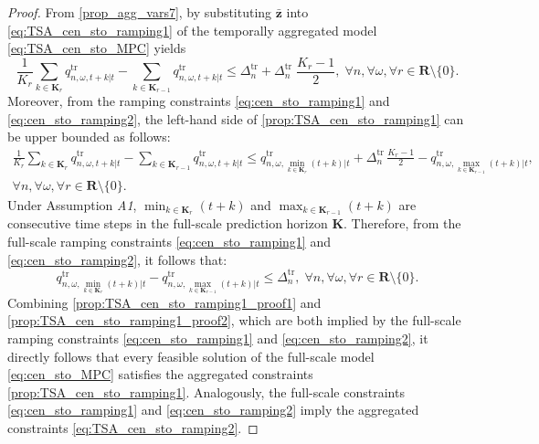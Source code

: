 \documentclass[10pt,a4paper]{amsart}
\begin{document}
\begin{proof}
From \eqref{prop_agg_vars7}, by substituting $\boldsymbol{\bar{z}}$ into \eqref{eq:TSA_cen_sto_ramping1} of the temporally aggregated model \eqref{eq:TSA_cen_sto_MPC} yields
\begin{equation}
\frac{1}{K_r} \sum_{k \in \boldsymbol{K}_r} q^{\mathrm{tr}}_{n, \omega, t+k|t}
- \sum_{k \in \boldsymbol{K}_{r-1}} q^{\mathrm{tr}}_{n, \omega, t+k|t}
\leq
\Delta^{\mathrm{tr}}_{n} + \Delta^{\mathrm{tr}}_{n} \; \frac{K_r - 1}{2}, \; \forall n, \forall \omega, \forall r \in \boldsymbol{R} \setminus \{0\}.
\label{prop:TSA_cen_sto_ramping1}
\end{equation}
Moreover, from the ramping constraints \eqref{eq:cen_sto_ramping1} and \eqref{eq:cen_sto_ramping2}, the left-hand side of \eqref{prop:TSA_cen_sto_ramping1} can be upper bounded as follows:
\begin{multline}
\frac{1}{K_r} \sum_{k \in \boldsymbol{K}_r} q^{\mathrm{tr}}_{n, \omega, t+k|t}
- \sum_{k \in \boldsymbol{K}_{r-1}} q^{\mathrm{tr}}_{n, \omega, t+k|t}
\leq
q^{\mathrm{tr}}_{n, \omega, \min_{k \in \boldsymbol{K}_r}(t+k)|t} + \Delta^{\mathrm{tr}}_{n} \, \frac{K_r - 1}{2} - q^{\mathrm{tr}}_{n, \omega, \max_{k \in \boldsymbol{K}_{r-1}}(t+k)|t},\\
\forall n, \forall \omega, \forall r \in \boldsymbol{R} \setminus \{0\}.
\label{prop:TSA_cen_sto_ramping1_proof1}
\end{multline}
Under Assumption \textit{A1}, $\min_{k \in \boldsymbol{K}_r}(t+k)$ and $\max_{k \in \boldsymbol{K}_{r-1}}(t+k)$ are consecutive time steps in the full-scale prediction horizon $\boldsymbol{K}$. Therefore, from the full-scale ramping constraints \eqref{eq:cen_sto_ramping1} and \eqref{eq:cen_sto_ramping2}, it follows that:
\begin{equation}
q^{\mathrm{tr}}_{n, \omega, \min_{k \in \boldsymbol{K}_r}(t+k)|t} - q^{\mathrm{tr}}_{n, \omega, \max_{k \in \boldsymbol{K}_{r-1}}(t+k)|t} \leq \Delta^{\mathrm{tr}}_{n}, \; \forall n, \forall \omega, \forall r \in \boldsymbol{R} \setminus \{0\}.
\label{prop:TSA_cen_sto_ramping1_proof2}
\end{equation}
Combining \eqref{prop:TSA_cen_sto_ramping1_proof1} and \eqref{prop:TSA_cen_sto_ramping1_proof2}, which are both implied by the full-scale ramping constraints \eqref{eq:cen_sto_ramping1} and \eqref{eq:cen_sto_ramping2}, it directly follows that every feasible solution of the full-scale model \eqref{eq:cen_sto_MPC} satisfies the aggregated constraints \eqref{prop:TSA_cen_sto_ramping1}.
Analogously, the full-scale constraints \eqref{eq:cen_sto_ramping1} and \eqref{eq:cen_sto_ramping2} imply the aggregated constraints \eqref{eq:TSA_cen_sto_ramping2}.


\end{proof}
\end{document}
